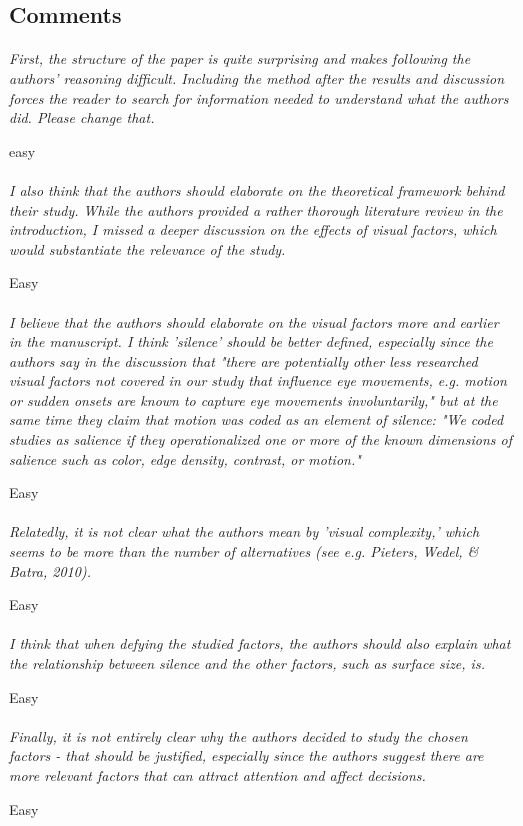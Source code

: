 \documentclass[english,natbib,man,floatsintext]{apa6}
\newcommand\eatpunct[1]{}
\newcommand{\com}[2][]{\vspace{5mm}\paragraph[ ]{ \eatpunct}\label{#1}\emph{#2}\vspace{5mm}}
\begin{document}
\subsection{Comments}

\com[com-r2-XX]{First, the structure of the paper is quite surprising and makes following the authors' reasoning difficult. Including the method after the results and discussion forces the reader to search for information needed to understand what the authors did. Please change that.}

easy


\com[com-r2-XX]{I also think that the authors should elaborate on the theoretical framework behind their study. While the authors provided a rather thorough literature review in the introduction, I missed a deeper discussion on the effects of visual factors, which would substantiate the relevance of the study.}

Easy


\com[com-r2-XX]{I believe that the authors should elaborate on the visual factors more and earlier in the manuscript. I think 'silence' should be better defined, especially since the authors say in the discussion that "there are potentially other less researched visual factors not covered in our study that influence eye movements, e.g. motion or sudden onsets are known to capture eye movements involuntarily," but at the same time they claim that motion was coded as an element of silence: "We coded studies as salience if they operationalized one or more of the known dimensions of salience such as color, edge density, contrast, or motion."}

Easy

\com[com-r2-XX]{Relatedly, it is not clear what the authors mean by 'visual complexity,' which seems to be more than the number of alternatives (see e.g. Pieters, Wedel, \& Batra, 2010).}

Easy


\com[com-r2-XX]{I think that when defying the studied factors, the authors should also explain what the relationship between silence and the other factors, such as surface size, is.}

Easy


\com[com-r2-XX]{Finally, it is not entirely clear why the authors decided to study the chosen factors - that should be justified, especially since the authors suggest there are more relevant factors that can attract attention and affect decisions.}

Easy
\end{document}
